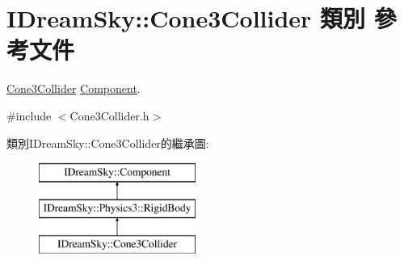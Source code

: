 \hypertarget{class_i_dream_sky_1_1_cone3_collider}{}\section{I\+Dream\+Sky\+:\+:Cone3\+Collider 類別 參考文件}
\label{class_i_dream_sky_1_1_cone3_collider}


\hyperlink{class_i_dream_sky_1_1_cone3_collider}{Cone3\+Collider} \hyperlink{class_i_dream_sky_1_1_component}{Component}.  




{\ttfamily \#include $<$Cone3\+Collider.\+h$>$}

類別\+I\+Dream\+Sky\+:\+:Cone3\+Collider的繼承圖\+:\begin{figure}[H]
\begin{center}
\leavevmode
\includegraphics[height=3.000000cm]{class_i_dream_sky_1_1_cone3_collider}
\end{center}
\end{figure}
